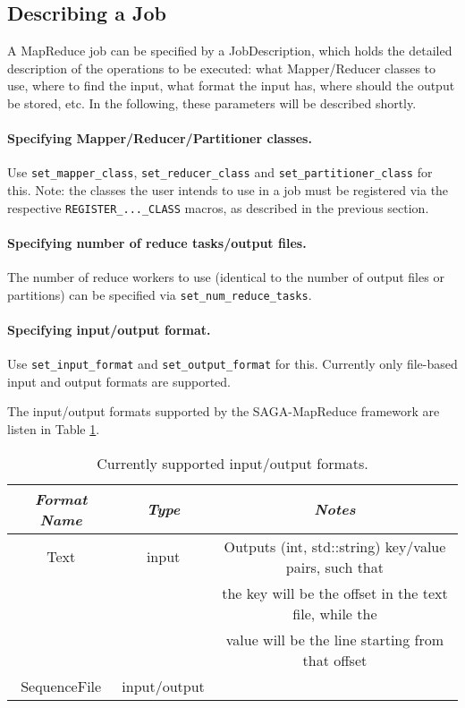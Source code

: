 \documentclass{article}
\begin{document}
\subsection{Describing a Job}

A MapReduce job can be specified by a JobDescription, which holds the detailed description of the operations to be executed: what Mapper/Reducer classes to use, where to find the input, what format the input has, where should the output be stored, etc. In the following, these parameters will be described shortly.

\paragraph{Specifying Mapper/Reducer/Partitioner classes.}

Use \texttt{set\_mapper\_class}, \texttt{set\_reducer\_class} and \texttt{set\_partitioner\_class} for this. Note: the classes the user intends to use in a job must be registered via the respective \texttt{REGISTER\_...\_CLASS} macros, as described in the previous section.

\paragraph{Specifying number of reduce tasks/output files.}

The number of reduce workers to use (identical to the number of output files or partitions) can be specified via \texttt{set\_num\_reduce\_tasks}.

\paragraph{Specifying input/output format.}

Use \texttt{set\_input\_format} and \texttt{set\_output\_format} for this. Currently only file-based input and output formats are supported.

The input/output formats supported by the SAGA-MapReduce framework are listen in Table \ref{tbl:formats}.

\begin{table}[htb!]
  \centering
\begin{tabular}{|c|c|c|}
  \hline
  \emph{Format Name} & \emph{Type} & \emph{Notes} \\
  \hline
  \hline
  Text & input & Outputs (int, std::string) key/value pairs, such that \\
   & & the key will be the offset in the text file, while the \\
   & & value will be the line starting from that offset \\
  \hline
  SequenceFile & input/output & \\
  \hline
\end{tabular}
\caption{Currently supported input/output formats.}
\label{tbl:formats}
\end{table}
\end{document}
